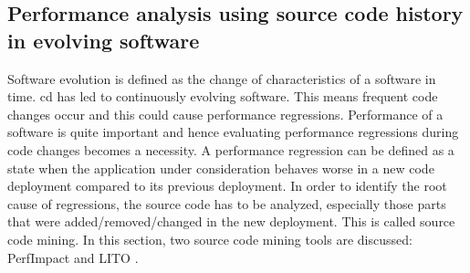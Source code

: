 \documentclass[article,type=msc,colorback,12pt,accentcolor=tud8b,table]{tudthesis}
\begin{document}
	\subsection{Performance analysis using source code history in evolving software}
	
	 Software evolution is defined as the change of characteristics of a software in time. \gls{cd} has led to continuously evolving software. This means frequent code changes occur and this could cause performance regressions. Performance of a software is quite important and hence evaluating performance regressions during code changes becomes a necessity. A performance regression can be defined as a state when the application under consideration behaves worse in a new code deployment compared to its previous deployment. In order to identify the root cause of regressions, the source code has to be analyzed, especially those parts that were added/removed/changed in the new deployment. This is called source code mining. In this section, two source code mining tools are discussed: PerfImpact \cite{luo2016mining} and LITO \cite{sandoval2016learning}.
\end{document}
